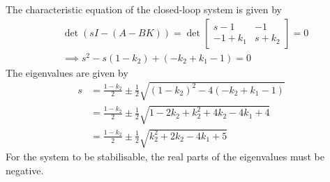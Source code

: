 The characteristic equation of the closed-loop system is given by
\begin{align*}
     &
    \det(sI-(A-BK))
    =
    \det
    \begin{bmatrix}
        s-1      & -1      \\
        -1+k_{1} & s+k_{2}
    \end{bmatrix}
    =
    0
    \\ &
    \implies
    s^2 - s(1-k_2) + (-k_2 + k_1 - 1) = 0
\end{align*}
The eigenvalues are given by
\begin{align*}
    s
     & =
    \frac{1-k_2}{2} \pm \frac{1}{2} \sqrt{{(1-k_2)}^2 - 4(-k_2 + k_1 - 1)}
    \\ & =
    \frac{1-k_2}{2} \pm \frac{1}{2} \sqrt{1 - 2k_2 + k_2^2 + 4k_2 - 4k_1 + 4}
    \\ & =
    \frac{1-k_2}{2} \pm \frac{1}{2} \sqrt{k_2^2 + 2k_2 - 4k_1 + 5}
\end{align*}
For the system to be stabilisable, the real parts of the eigenvalues must be negative.
